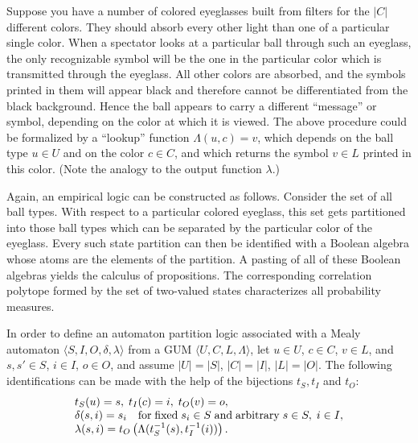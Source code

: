 \documentclass{llncs}
\begin{document}
Suppose you have a number of colored eyeglasses built from filters for the
$\vert C\vert $ different colors.
They should  absorb every other light than one of a particular single color.
When a spectator looks at a particular ball through such an eyeglass,
the only recognizable symbol will be the one in the particular
color which is transmitted through the eyeglass.
All other colors are absorbed, and the symbols printed in them will appear black
and therefore cannot be differentiated from the black background.
Hence the ball appears to carry a different ``message'' or symbol,
depending on the color at which it is viewed.
The above procedure could be formalized by a  ``lookup'' function $\Lambda (u,c)=v$,
which depends on the ball type $u\in U$ and on the color
$c\in C$, and which returns the symbol
$v\in L$ printed in this color.
(Note the analogy to the output function $\lambda$.)


Again, an empirical logic can be constructed as follows.
Consider the set of all ball types.
With respect to a particular colored eyeglass, this set
gets partitioned into those ball types which can be separated by the particular color of
the eyeglass.
Every such state partition can then be identified with a Boolean algebra whose atoms are the elements of the partition.
A pasting of all of these Boolean algebras yields the calculus of propositions.
The corresponding correlation polytope formed by the set of two-valued states
characterizes all probability measures.


In order to define an automaton partition logic associated with a Mealy automaton
$\langle S,I,O,\delta ,\lambda \rangle$
from a GUM $\langle U,C,L,\Lambda \rangle $,
let
$u\in U$,
$c\in C$,
$v\in L$,
and
$s,s'\in S$,
$i\in I$,
$o\in O$, and assume
$\vert U\vert =\vert S\vert$,
$\vert C\vert =\vert I\vert$,
$\vert L\vert =\vert O\vert$.
The following identifications can be made
with the help of  the bijections $t_S,t_I$ and $t_O$:
\begin{equation}
\begin{array}{llllll}
t_S(u)=s, \;
 t_I(c)=i, \;
 t_O(v)=o, \\
\delta (s,i)= s_i  \quad {\rm for \; fixed\;}s_i\in S {\rm \;and \;
arbitrary\;}s\in S,\; i\in I,\\
\lambda  (s,i) = t_O\left(\Lambda (t_S^{-1}(s),t_I^{-1}(i))\right).
\end{array}
\label{oto-ua}
\end{equation}
\end{document}
